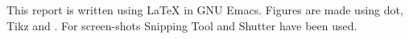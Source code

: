 \thispagestyle{empty}
{\small
\strut\vfill %
\noindent This report is written using \LaTeX{} in GNU Emacs.
Figures are made using dot, Tikz and \pyt{}.
For screen-shots Snipping Tool and Shutter have been used.
}
\clearpage

